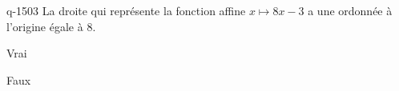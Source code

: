 \begin{truefalse}{q-1503}
La droite qui représente la fonction affine $x\mapsto 8x-3$ a une ordonnée à l'origine égale à $8$.
\item Vrai
\item* Faux
\end{truefalse}

